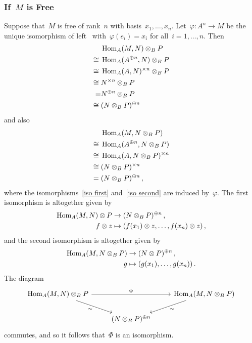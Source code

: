 \subsubsection{If~$M$ is Free}

Suppose that~$M$ is free of rank~$n$ with basis~$x_1, \dotsc, x_n$.
Let~$\varphi \colon A^n \to M$ be the unique isomorphism of left~{} with~$\varphi(e_i) = x_i$ for all~$i = 1, \dotsc, n$.
Then
\begin{align}
       {}&  \operatorname{Hom}_A(M, N) \otimes_B P  \notag  \\
  \cong{}&  \operatorname{Hom}_A(A^{\oplus n}, N) \otimes_B P \label{iso first} \\
  \cong{}&  \operatorname{Hom}_A(A, N)^{\times n} \otimes_B P \notag  \\
  \cong{}&  N^{\times n} \otimes_B P  \notag  \\
        =&  N^{\oplus n} \otimes_B P  \notag  \\
  \cong{}&  (N \otimes_B P)^{\oplus n}  \notag
\end{align}
and also
\begin{align}
       {}&  \operatorname{Hom}_A(M, N \otimes_B P)  \notag  \\
  \cong{}&  \operatorname{Hom}_A(A^{\oplus n}, N \otimes_B P) \label{iso second}  \\
  \cong{}&  \operatorname{Hom}_A(A, N \otimes_B P)^{\times n} \notag  \\
  \cong{}&  (N \otimes_B P)^{\times n}  \notag  \\
      ={}&  (N \otimes_B P)^{\oplus n}  \notag  \,,
\end{align}
where the isomorphisms~\eqref{iso first} and~\eqref{iso second} are induced by~$\varphi$.
The first isomorphism is altogether given by
\begin{align*}
            \operatorname{Hom}_A(M, N) \otimes P
  &\to      (N \otimes_B P)^{\oplus n} \,,
  \\
            f \otimes z
  &\mapsto  ( f(x_1) \otimes z, \dotsc, f(x_n) \otimes z ) \,,
\end{align*}
and the second isomorphism is altogether given by
\begin{align*}
            \operatorname{Hom}_A(M, N \otimes_B P)
  &\to      (N \otimes P)^{\oplus n} \,,
  \\
            g
  &\mapsto  ( g(x_1), \dotsc, g(x_n) ) \,.
\end{align*}
The diagram
\[
  \begin{tikzcd}
      \Hom_A(M, N) \tensor_B P
      \arrow{dr}[below left]{\sim}
      \arrow{rr}[above]{\Phi}
    & {}
    & \Hom_A(M, N \tensor_B P)
      \arrow{dl}[below right]{\sim}
    \\
      {}
    & (N \tensor_B P)^{\oplus n}
    & {}
  \end{tikzcd}
\]
commutes, and so it follows that~$\Phi$ is an isomorphism.





